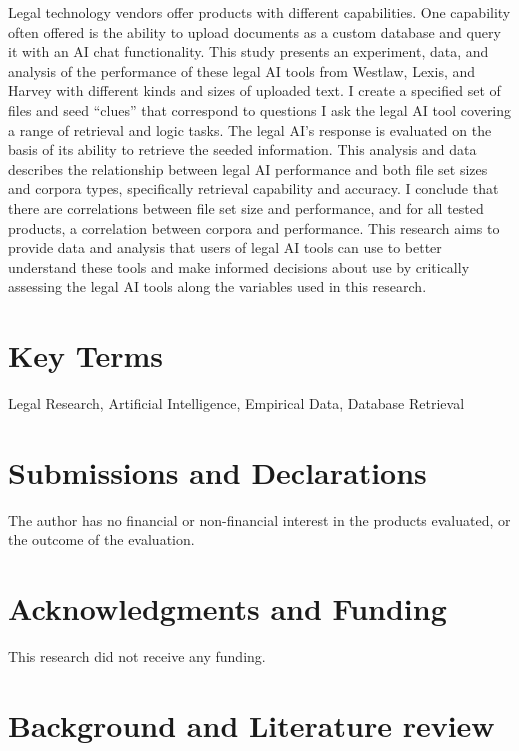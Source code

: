 \documentclass[
]{article}
\begin{document}
Legal technology vendors offer products with different capabilities. One capability often offered is the ability to upload documents as a custom database and query it with an AI chat functionality. This study presents an experiment, data, and analysis of the performance of these legal AI tools from Westlaw, Lexis, and Harvey with different kinds and sizes of uploaded text. I create a specified set of files and seed ``clues'' that correspond to questions I ask the legal AI tool covering a range of retrieval and logic tasks. The legal AI's response is evaluated on the basis of its ability to retrieve the seeded information. This analysis and data describes the relationship between legal AI performance and both file set sizes and corpora types, specifically retrieval capability and accuracy. I conclude that there are correlations between file set size and performance, and for all tested products, a correlation between corpora and performance. This research aims to provide data and analysis that users of legal AI tools can use to better understand these tools and make informed decisions about use by critically assessing the legal AI tools along the variables used in this research.

\section{Key Terms}\label{key-terms}

Legal Research, Artificial Intelligence, Empirical Data, Database Retrieval

\section{Submissions and Declarations}\label{submissions-and-declarations}

The author has no financial or non-financial interest in the products evaluated, or the outcome of the evaluation.

\section{Acknowledgments and Funding}\label{acknowledgments-and-funding}

This research did not receive any funding.

\section{Background and Literature review}\label{background-and-literature-review}
\end{document}
